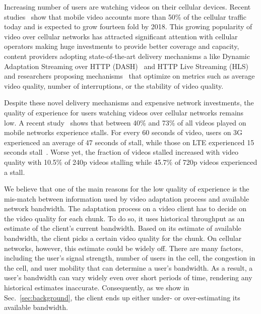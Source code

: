 Increasing number of users are watching videos on their cellular
devices. Recent studies~\cite{cisco-vni} show that mobile video
accounts more than 50\% of the cellular traffic today and is expected
to grow fourteen fold by 2018. This growing popularity of video over
cellular networks has attracted significant attention with cellular
operators making huge investments to provide better coverage and
capacity, content providers adopting state-of-the-art delivery
mechanisms a like Dynamic Adaptation Streaming over HTTP
(DASH)~\cite{DASH} and HTTP Live Streaming (HLS)~\cite{HLS} and
researchers proposing mechanisms~\cite{HLS,Festive,BBA} that optimize
on metrics such as average video quality, number of interruptions, or
the stability of video quality.

Despite these novel delivery mechanisms and expensive network
investments, the quality of experience for users watching videos over
cellular networks remains low. A recent study~\cite{opera-stall} shows
that between 40\% and 73\% of all videos played on mobile networks
experience stalls. For every 60 seconds of video, users on 3G
experienced an average of 47 seconds of stall, while those on LTE
experienced 15 seconds stall~\cite{citrix-stall}. Worse yet, the
fraction of videos stalled increased with video quality with 10.5\% of
240p videos stalling while 45.7\% of 720p videos experienced a
stall. 

We believe that one of the main reasons for the low quality of
experience is the mis-match between information used by video
adaptation process and available network bandwidth. The adaptation
process on a video client has to decide on the video quality for each
chunk. To do so, it uses historical throughput as an estimate of the
client's current bandwidth. Based on its estimate of available
bandwidth, the client picks a certain video quality for the chunk. On
cellular networks, however, this estimate could be widely off. There
are many factors, including the user's signal strength, number of
users in the cell, the congestion in the cell, and user mobility that
can determine a user's bandwidth. As a result, a user's bandwidth can
vary widely even over short periods of time, rendering any historical
estimates inaccurate. Consequently, as we show in
Sec.~\ref{sec:background}, the client ends up either under- or
over-estimating its available bandwidth.

